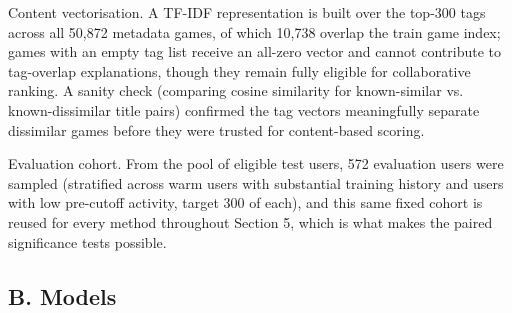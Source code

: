 \documentclass[conference]{IEEEtran}
\begin{document}
Content vectorisation. A TF-IDF representation is built over the top-300 tags across all 50,872 metadata games, of which 10,738 overlap the train game index; games with an empty tag list receive an all-zero vector and cannot contribute to tag-overlap explanations, though they remain fully eligible for collaborative ranking. A sanity check (comparing cosine similarity for known-similar vs. known-dissimilar title pairs) confirmed the tag vectors meaningfully separate dissimilar games before they were trusted for content-based scoring.

Evaluation cohort. From the pool of eligible test users, 572 evaluation users were sampled (stratified across warm users with substantial training history and users with low pre-cutoff activity, target 300 of each), and this same fixed cohort is reused for every method throughout Section 5, which is what makes the paired significance tests possible.

\subsection*{B. Models}
\end{document}
